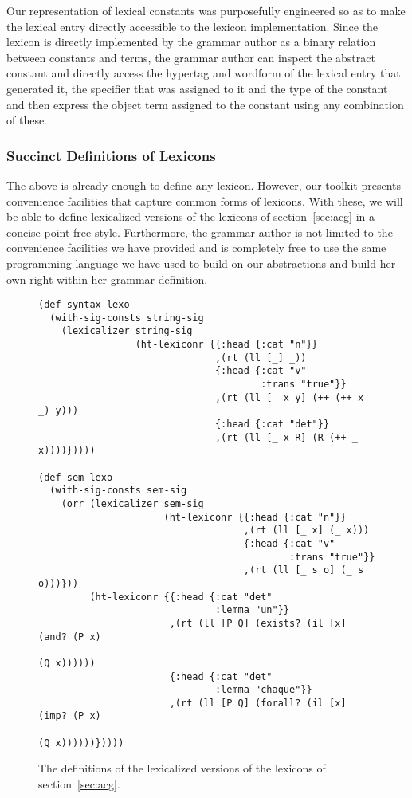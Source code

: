 Our representation of lexical constants was purposefully engineered so
as to make the lexical entry directly accessible to the lexicon
implementation. Since the lexicon is directly implemented by the grammar
author as a binary relation between constants and terms, the grammar
author can inspect the abstract constant and directly access the
hypertag and wordform of the lexical entry that generated it, the
specifier that was assigned to it and the type of the constant and then
express the object term assigned to the constant using any combination
of these.

\subsubsection{Succinct Definitions of Lexicons}

The above is already enough to define any lexicon. However, our toolkit
presents convenience facilities that capture common forms of
lexicons. With these, we will be able to define lexicalized versions of
the lexicons of section~\ref{sec:acg} in a concise point-free
style. Furthermore, the grammar author is not limited to the convenience
facilities we have provided and is completely free to use the same
programming language we have used to build on our abstractions and build
her own right within her grammar definition.

\begin{figure}
  \centering
\begin{verbatim}
(def syntax-lexo
  (with-sig-consts string-sig
    (lexicalizer string-sig
                 (ht-lexiconr {{:head {:cat "n"}}
                               ,(rt (ll [_] _))
                               {:head {:cat "v"
                                       :trans "true"}}
                               ,(rt (ll [_ x y] (++ (++ x _) y)))
                               {:head {:cat "det"}}
                               ,(rt (ll [_ x R] (R (++ _ x))))}))))

(def sem-lexo
  (with-sig-consts sem-sig
    (orr (lexicalizer sem-sig
                      (ht-lexiconr {{:head {:cat "n"}}
                                    ,(rt (ll [_ x] (_ x)))
                                    {:head {:cat "v"
                                            :trans "true"}}
                                    ,(rt (ll [_ s o] (_ s o)))}))
         (ht-lexiconr {{:head {:cat "det"
                               :lemma "un"}}
                       ,(rt (ll [P Q] (exists? (il [x] (and? (P x)
                                                             (Q x))))))
                       {:head {:cat "det"
                               :lemma "chaque"}}
                       ,(rt (ll [P Q] (forall? (il [x] (imp? (P x)
                                                             (Q x))))))}))))
\end{verbatim}
  \caption{\label{fig:lex-impl} The definitions of the lexicalized
    versions of the lexicons of section~\ref{sec:acg}.}
\end{figure}


